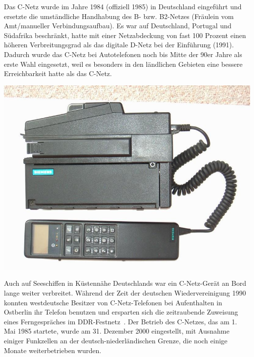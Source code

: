 \begin{multicols}{3}
Das C-Netz wurde im Jahre 1984 (offiziell 1985) in Deutschland eingeführt und ersetzte die umständliche Handhabung des B- bzw. B2-Netzes (Fräulein vom Amt/manueller Verbindungsaufbau). Es war auf Deutschland, Portugal und Südafrika beschränkt, hatte mit einer Netzabdeckung von fast 100 Prozent einen höheren Verbreitungsgrad als das digitale D-Netz bei der Einführung (1991). Dadurch wurde das C-Netz bei Autotelefonen noch bis Mitte der 90er Jahre als erste Wahl eingesetzt, weil es besonders in den ländlichen Gebieten eine bessere Erreichbarkeit hatte als das C-Netz. 
\begin{Figure}
\includegraphics[width=\linewidth]{Kapitel/C-Netz/Grafiken/SiemensC1.jpg}
\label{fig:c-netz.mobiltelefonZwei}
\end{Figure}
Auch auf Seeschiffen in Küstennähe Deutschlands war ein C-Netz-Gerät an Bord lange weiter verbreitet. Während der Zeit der deutschen Wiedervereinigung 1990 konnten westdeutsche Besitzer von C-Netz-Telefonen bei Aufenthalten in Ostberlin ihr Telefon benutzen und ersparten sich die zeitraubende Zuweisung eines Ferngespräches im DDR-Festnetz~\cite{c-netz.3}.
Der Betrieb des C-Netzes, das am 1. Mai 1985 startete, wurde am 31. Dezember 2000 eingestellt, mit Ausnahme einiger Funkzellen an der deutsch-niederländischen Grenze, die noch einige Monate weiterbetrieben wurden.



\end{multicols}
